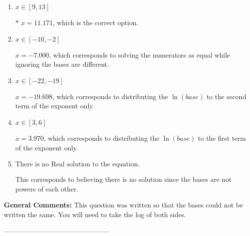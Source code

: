 \documentclass{extbook}[14pt]
\begin{document}
\begin{enumerate}[label=\Alph*.] 
\item $ x \in [9, 13] $ 

 * $x = 11.171$, which is the correct option. 
\item $ x \in [-10, -2] $ 

 $x = -7.000$, which corresponds to solving the numerators as equal while ignoring the bases are different. 
\item $ x \in [-22, -19] $ 

 $x = -19.698$, which corresponds to distributing the $\ln(base)$ to the second term of the exponent only. 
\item $ x \in [3, 6] $ 

 $x = 3.970$, which corresponds to distributing the $\ln(base)$ to the first term of the exponent only. 
\item $ \text{There is no Real solution to the equation.} $ 

 This corresponds to believing there is no solution since the bases are not powers of each other. 
\end{enumerate} 
 
\textbf{General Comments:} This question was written so that the bases could not be written the same. You will need to take the log of both sides.

-----------------------------------------------
\end{document}
